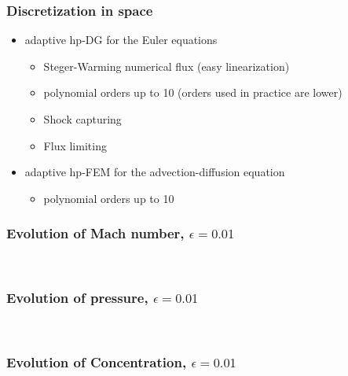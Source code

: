 \documentclass{beamer}
\begin{document}
\begin{frame}
\frametitle{Discretization in space}
\begin{itemize}
\item
adaptive hp-DG for the Euler equations
\begin{itemize}
\item Steger-Warming numerical flux (easy linearization) %
\item	
polynomial orders up to 10 (orders used in practice are lower)
\item
Shock capturing
\item
Flux limiting
\end{itemize}
\item
adaptive hp-FEM for the advection-diffusion equation
\begin{itemize}
\item
polynomial orders up to 10
\end{itemize}
\end{itemize}
\end{frame}




\begin{frame}
\frametitle{Evolution of Mach number, $\epsilon = 0.01$}
\begin{center}
\\
\hspace{2mm}
\end{center}
\end{frame}

\begin{frame}
\frametitle{Evolution of pressure, $\epsilon = 0.01$}
\begin{center}
\\
\hspace{2mm}
\end{center}
\end{frame}

\begin{frame}
\frametitle{Evolution of Concentration, $\epsilon = 0.01$}
\begin{center}
\\
\hspace{2mm}
\end{center}
\end{frame}
\end{document}
